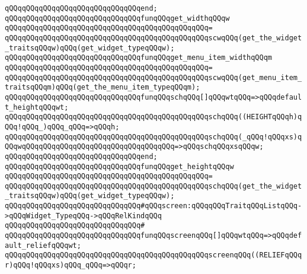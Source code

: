 \verb|qQQqqQQqqQQqqQQqqQQqqQQqqQQqqQQqend;|\newline
\newline
\verb|qQQqqQQqqQQqqQQqqQQqqQQqqQQqqQQqfunqQQqget_widthqQQqw|\newline
\verb|qQQqqQQqqQQqqQQqqQQqqQQqqQQqqQQqqQQqqQQqqQQqqQQq=|\newline
\verb|qQQqqQQqqQQqqQQqqQQqqQQqqQQqqQQqqQQqqQQqqQQqqQQqscwqQQq(get_the_widget_traitsqQQqw)qQQq(get_widget_typeqQQqw);|\newline
\newline
\verb|qQQqqQQqqQQqqQQqqQQqqQQqqQQqqQQqfunqQQqget_menu_item_widthqQQqm|\newline
\verb|qQQqqQQqqQQqqQQqqQQqqQQqqQQqqQQqqQQqqQQqqQQqqQQq=|\newline
\verb|qQQqqQQqqQQqqQQqqQQqqQQqqQQqqQQqqQQqqQQqqQQqqQQqscwqQQq(get_menu_item_traitsqQQqm)qQQq(get_the_menu_item_typeqQQqm);|\newline
\newline
\verb|qQQqqQQqqQQqqQQqqQQqqQQqqQQqqQQqfunqQQqschqQQq[]qQQqwtqQQq=>qQQqdefault_heightqQQqwt;|\newline
\verb|qQQqqQQqqQQqqQQqqQQqqQQqqQQqqQQqqQQqqQQqqQQqqQQqschqQQq((HEIGHTqQQqh)qQQq!qQQq_)qQQq_qQQq=>qQQqh;|\newline
\verb|qQQqqQQqqQQqqQQqqQQqqQQqqQQqqQQqqQQqqQQqqQQqqQQqschqQQq(_qQQq!qQQqxs)qQQqwqQQqqQQqqQQqqQQqqQQqqQQqqQQqqQQqqQQq=>qQQqschqQQqxsqQQqw;|\newline
\verb|qQQqqQQqqQQqqQQqqQQqqQQqqQQqqQQqend;|\newline
\newline
\verb|qQQqqQQqqQQqqQQqqQQqqQQqqQQqqQQqfunqQQqget_heightqQQqw|\newline
\verb|qQQqqQQqqQQqqQQqqQQqqQQqqQQqqQQqqQQqqQQqqQQqqQQq=|\newline
\verb|qQQqqQQqqQQqqQQqqQQqqQQqqQQqqQQqqQQqqQQqqQQqqQQqschqQQq(get_the_widget_traitsqQQqw)qQQq(get_widget_typeqQQqw);|\newline
\newline
\verb|qQQqqQQqqQQqqQQqqQQqqQQqqQQqqQQq#qQQqscreen:qQQqqQQqTraitqQQqListqQQq->qQQqWidget_TypeqQQq->qQQqRelKindqQQq|\newline
\verb|qQQqqQQqqQQqqQQqqQQqqQQqqQQqqQQq#|\newline
\verb|qQQqqQQqqQQqqQQqqQQqqQQqqQQqqQQqfunqQQqscreenqQQq[]qQQqwtqQQq=>qQQqdefault_reliefqQQqwt;|\newline
\verb|qQQqqQQqqQQqqQQqqQQqqQQqqQQqqQQqqQQqqQQqqQQqqQQqscreenqQQq((RELIEFqQQqr)qQQq!qQQqxs)qQQq_qQQq=>qQQqr;|\newline
